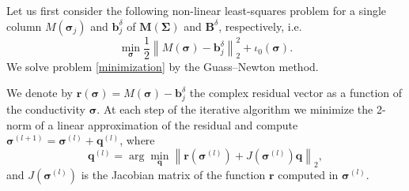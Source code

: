 \documentclass[final,leqno]{siamltex}
\newcommand{\norm}[1]{\left\| #1 \right\|}
\newcommand{\sigmab}{\boldsymbol{\sigma}}
\newcommand{\Sigmab}{\mathbf{\Sigma}}
\begin{document}
Let us first consider the following non-linear least-squares problem for a single column $M(\sigmab_j)$ and $\mathbf{b}_j^\delta$ of $\mathbf{M}(\Sigmab)$ and $\mathbf{B}^\delta$, respectively, i.e.
\begin{equation}\label{minimization}
\min_{\sigmab} \frac{1}{2} \norm{{M}(\sigmab)-\mathbf{b}_j^\delta}_2^2+\iota_0(\sigmab).
\end{equation}
We solve problem \eqref{minimization} by the Guass--Newton method.

We denote by $\mathbf{r}(\sigmab) = {M}(\sigmab)-\mathbf{b}^\delta_j$ the complex residual vector as a function of the conductivity $\sigmab$. At each step of the iterative algorithm we minimize the 2-norm of a linear approximation of the residual and compute $\sigmab^{(l+1)}=\sigmab^{(l)}+\mathbf{q}^{(l)}$, where
\begin{equation}\label{gaussnewt}
\displaystyle \mathbf{q}^{(l)}=\arg\min_{\mathbf{q}} \norm{\mathbf{r}(\sigmab^{(l)}) + J(\sigmab^{(l)})\mathbf{q}}_2,
\end{equation}
and $J(\sigmab^{(l)})$ is the Jacobian matrix of the function $\mathbf{r}$ computed in $\sigmab^{(l)}$.
\end{document}
